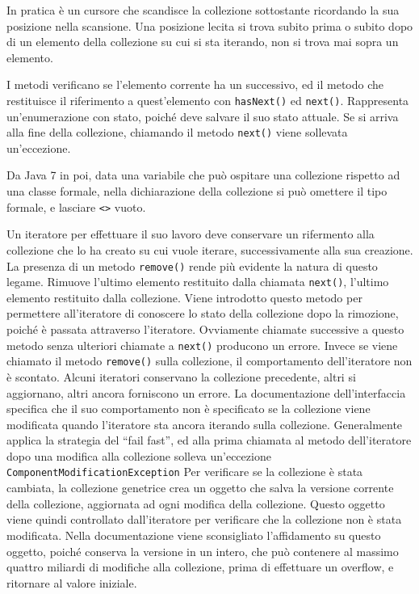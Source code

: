 \documentclass{article}
\numberwithin{equation}{subsection}
\begin{document}
In pratica è un cursore che scandisce la collezione sottostante ricordando la sua posizione nella scansione. Una posizione lecita si trova subito prima o subito dopo di un 
elemento della collezione su cui si sta iterando, non si trova mai sopra un elemento. 

I metodi verificano se l'elemento corrente ha un successivo, ed il metodo che restituisce il riferimento a quest'elemento con \verb|hasNext()| ed \verb|next()|. 
Rappresenta un'enumerazione con stato, poiché deve salvare il suo stato attuale. Se si arriva alla fine della collezione, chiamando il metodo \verb|next()| viene 
sollevata un'eccezione. 


Da Java 7 in poi, data una variabile che può ospitare una collezione rispetto ad una classe formale, nella dichiarazione della collezione si può omettere il tipo formale, e 
lasciare \verb|<>| vuoto. 



Un iteratore per effettuare il suo lavoro deve conservare un rifermento alla collezione che lo ha creato su cui vuole iterare, successivamente alla sua creazione. 
La presenza di un metodo \verb|remove()| rende più evidente la natura di questo legame. Rimuove l'ultimo elemento restituito dalla chiamata \verb|next()|, l'ultimo 
elemento restituito dalla collezione. Viene introdotto questo metodo per permettere all'iteratore di conoscere lo stato della collezione dopo la rimozione, poiché è 
passata attraverso l'iteratore. 
Ovviamente chiamate successive a questo metodo senza ulteriori chiamate a \verb|next()| producono un errore. Invece se viene chiamato il metodo \verb|remove()| sulla 
collezione, il comportamento dell'iteratore non è scontato. 
Alcuni iteratori conservano la collezione precedente, altri si aggiornano, altri ancora forniscono un errore. 
La documentazione dell'interfaccia specifica che il suo comportamento non è specificato se la collezione viene modificata quando l'iteratore sta ancora iterando sulla collezione. 
Generalmente applica la strategia del ``fail fast'', ed alla prima chiamata al metodo dell'iteratore dopo una modifica alla collezione solleva un'eccezione \verb|ComponentModificationException|
Per verificare se la collezione è stata cambiata, la collezione genetrice crea un oggetto che salva la versione corrente della collezione, aggiornata ad ogni modifica 
della collezione. Questo oggetto viene quindi controllato dall'iteratore per verificare che la collezione non è stata modificata. 
Nella documentazione viene sconsigliato l'affidamento su questo oggetto, poiché conserva la versione in un intero, che può contenere al massimo quattro miliardi di modifiche 
alla collezione, prima di effettuare un overflow, e ritornare al valore iniziale. 
\end{document}

